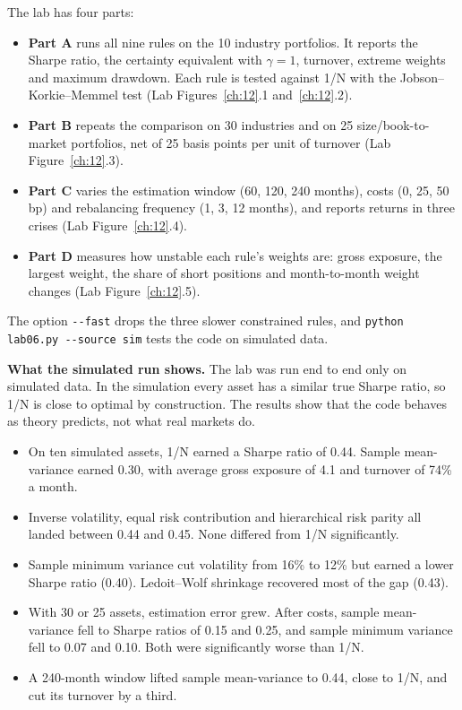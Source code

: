 The lab has four parts:

\begin{itemize}
  \item \textbf{Part A} runs all nine rules on the 10 industry portfolios. It reports the Sharpe ratio, the certainty equivalent with $\gamma = 1$, turnover, extreme weights and maximum drawdown. Each rule is tested against 1/N with the Jobson--Korkie--Memmel test (Lab Figures~\ref{ch:12}.1 and~\ref{ch:12}.2).
  \item \textbf{Part B} repeats the comparison on 30 industries and on 25 size/book-to-market portfolios, net of 25 basis points per unit of turnover (Lab Figure~\ref{ch:12}.3).
  \item \textbf{Part C} varies the estimation window (60, 120, 240 months), costs (0, 25, 50 bp) and rebalancing frequency (1, 3, 12 months), and reports returns in three crises (Lab Figure~\ref{ch:12}.4).
  \item \textbf{Part D} measures how unstable each rule's weights are: gross exposure, the largest weight, the share of short positions and month-to-month weight changes (Lab Figure~\ref{ch:12}.5).
\end{itemize}

{\sloppy The option \texttt{-{}-fast} drops the three slower constrained rules, and \texttt{python lab06.py -{}-source sim} tests the code on simulated data.\par}

\textbf{What the simulated run shows.} The lab was run end to end only on simulated data. In the simulation every asset has a similar true Sharpe ratio, so 1/N is close to optimal by construction. The results show that the code behaves as theory predicts, not what real markets do.

\begin{itemize}
  \item On ten simulated assets, 1/N earned a Sharpe ratio of 0.44. Sample mean-variance earned 0.30, with average gross exposure of 4.1 and turnover of 74\% a month.
  \item Inverse volatility, equal risk contribution and hierarchical risk parity all landed between 0.44 and 0.45. None differed from 1/N significantly.
  \item Sample minimum variance cut volatility from 16\% to 12\% but earned a lower Sharpe ratio (0.40). Ledoit--Wolf shrinkage recovered most of the gap (0.43).
  \item With 30 or 25 assets, estimation error grew. After costs, sample mean-variance fell to Sharpe ratios of 0.15 and 0.25, and sample minimum variance fell to 0.07 and 0.10. Both were significantly worse than 1/N.
  \item A 240-month window lifted sample mean-variance to 0.44, close to 1/N, and cut its turnover by a third.
\end{itemize}

